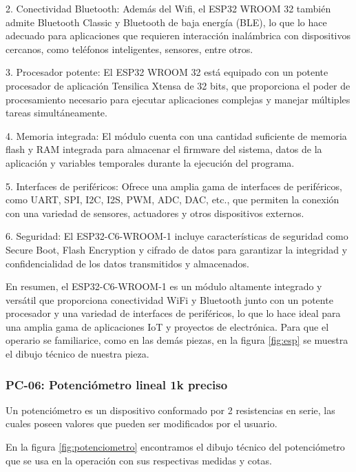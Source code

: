     2. Conectividad Bluetooth: Además del Wifi, el ESP32 WROOM 32 también admite Bluetooth Classic y Bluetooth de baja energía (BLE), lo que lo hace adecuado para aplicaciones que requieren interacción inalámbrica con dispositivos cercanos, como teléfonos inteligentes, sensores, entre otros.
    
    3. Procesador potente: El ESP32 WROOM 32 está equipado con un potente procesador de aplicación Tensilica Xtensa de 32 bits, que proporciona el poder de procesamiento necesario para ejecutar aplicaciones complejas y manejar múltiples tareas simultáneamente.
    
    4. Memoria integrada: El módulo cuenta con una cantidad suficiente de memoria flash y RAM integrada para almacenar el firmware del sistema, datos de la aplicación y variables temporales durante la ejecución del programa.
    
    5. Interfaces de periféricos: Ofrece una amplia gama de interfaces de periféricos, como UART, SPI, I2C, I2S, PWM, ADC, DAC, etc., que permiten la conexión con una variedad de sensores, actuadores y otros dispositivos externos.
    
    6. Seguridad: El ESP32-C6-WROOM-1 incluye características de seguridad como Secure Boot, Flash Encryption y cifrado de datos para garantizar la integridad y confidencialidad de los datos transmitidos y almacenados.
    
    En resumen, el ESP32-C6-WROOM-1 es un módulo altamente integrado y versátil que proporciona conectividad WiFi y Bluetooth junto con un potente procesador y una variedad de interfaces de periféricos, lo que lo hace ideal para una amplia gama de aplicaciones IoT y proyectos de electrónica. Para que el operario se familiarice, como en las demás piezas, en la figura \ref{fig:esp} se muestra el dibujo técnico de nuestra pieza.
    
    
    
    \subsubsection{PC-06: Potenciómetro lineal 1k preciso }
    
    Un potenciómetro es un dispositivo conformado por 2 resistencias en serie, las cuales poseen valores que pueden ser modificados por el usuario. 
    
    En la figura \ref{fig:potenciometro} encontramos el dibujo técnico del potenciómetro que se usa en la operación con sus respectivas medidas y cotas.
    
